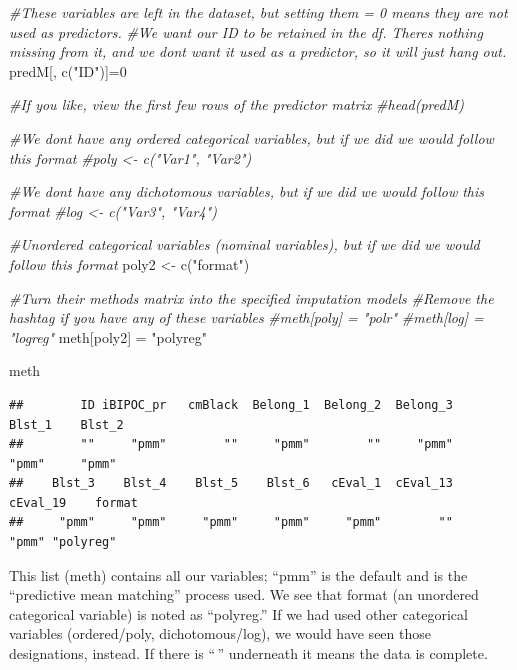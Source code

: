 \documentclass[
  11pt,
]{book}
\newenvironment{Shaded}{\begin{snugshade}}{\end{snugshade}}
\newcommand{\CommentTok}[1]{\textcolor[rgb]{0.56,0.35,0.01}{\textit{#1}}}
\newcommand{\DecValTok}[1]{\textcolor[rgb]{0.00,0.00,0.81}{#1}}
\newcommand{\FunctionTok}[1]{\textcolor[rgb]{0.00,0.00,0.00}{#1}}
\newcommand{\NormalTok}[1]{#1}
\newcommand{\OtherTok}[1]{\textcolor[rgb]{0.56,0.35,0.01}{#1}}
\newcommand{\StringTok}[1]{\textcolor[rgb]{0.31,0.60,0.02}{#1}}
\begin{document}
\begin{Shaded}
\begin{Highlighting}[]
\CommentTok{\#These variables are left in the dataset, but setting them = 0 means they are not used as predictors.  }
\CommentTok{\#We want our ID to be retained in the df.  There\textquotesingle{}s nothing missing from it, and we don\textquotesingle{}t want it used as a predictor, so it will just hang out.}
\NormalTok{predM[, }\FunctionTok{c}\NormalTok{(}\StringTok{"ID"}\NormalTok{)]}\OtherTok{=}\DecValTok{0}

\CommentTok{\#If you like, view the first few rows of the predictor matrix}
\CommentTok{\#head(predM)}

\CommentTok{\#We don\textquotesingle{}t have any ordered categorical variables, but if we did we would follow this format}
\CommentTok{\#poly \textless{}{-} c("Var1", "Var2")}

\CommentTok{\#We don\textquotesingle{}t have any dichotomous variables, but if we did we would follow this format}
\CommentTok{\#log \textless{}{-} c("Var3", "Var4")}

\CommentTok{\#Unordered categorical variables (nominal variables), but if we did we would follow this format}
\NormalTok{poly2 }\OtherTok{\textless{}{-}} \FunctionTok{c}\NormalTok{(}\StringTok{"format"}\NormalTok{)}

\CommentTok{\#Turn their methods matrix into the specified imputation models}
\CommentTok{\#Remove the hashtag if you have any of these variables}
\CommentTok{\#meth[poly] = "polr" }
\CommentTok{\#meth[log] = "logreg"}
\NormalTok{meth[poly2] }\OtherTok{=} \StringTok{"polyreg"}

\NormalTok{meth}
\end{Highlighting}
\end{Shaded}

\begin{verbatim}
##        ID iBIPOC_pr   cmBlack  Belong_1  Belong_2  Belong_3    Blst_1    Blst_2 
##        ""     "pmm"        ""     "pmm"        ""     "pmm"     "pmm"     "pmm" 
##    Blst_3    Blst_4    Blst_5    Blst_6   cEval_1  cEval_13  cEval_19    format 
##     "pmm"     "pmm"     "pmm"     "pmm"     "pmm"        ""     "pmm" "polyreg"
\end{verbatim}

This list (meth) contains all our variables; ``pmm'' is the default and is the ``predictive mean matching'' process used. We see that format (an unordered categorical variable) is noted as ``polyreg.'' If we had used other categorical variables (ordered/poly, dichotomous/log), we would have seen those designations, instead. If there is ``\,'' underneath it means the data is complete.
\end{document}
